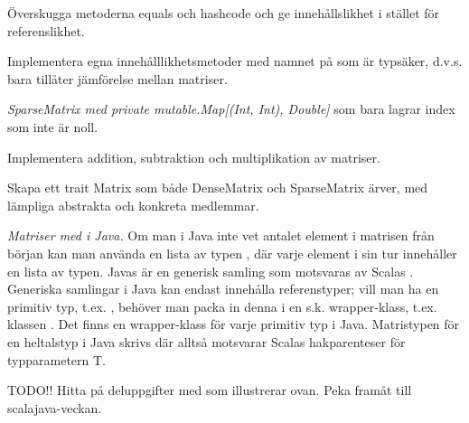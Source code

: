 \Subtask Överskugga metoderna equals och hashcode och ge  innehållslikhet i stället för referenslikhet.

\Subtask Implementera egna innehålllikhetsmetoder med namnet \code{===} på  som är typsäker, d.v.s. bara tillåter jämförelse mellan matriser.

\Subtask \emph{SparseMatrix med private mutable.Map[(Int, Int), Double]} som bara lagrar index som inte är noll.

\Subtask Implementera addition, subtraktion och multiplikation av matriser.

\Subtask Skapa ett trait Matrix som både DenseMatrix och SparseMatrix ärver, med lämpliga abstrakta och konkreta medlemmar.

\Task \emph{Matriser med  i Java.} Om man i Java inte vet antalet element i matrisen från början kan man använda en lista av typen , där varje element i sin tur innehåller en lista av typen. Javas  är en generisk samling som motsvaras av Scalas . Generiska samlingar i Java kan endast innehålla referenstyper; vill man ha en primitiv typ, t.ex. , behöver man packa in denna i en s.k. wrapper-klass, t.ex.  klassen . Det finns en wrapper-klass för varje primitiv typ i Java. Matristypen för en heltalstyp i Java skrivs  där alltså  motsvarar Scalas hakparenteser \code{[T]} för typparametern T.


\Subtask TODO!! Hitta på deluppgifter med  som illustrerar ovan. Peka framåt till scalajava-veckan.

    